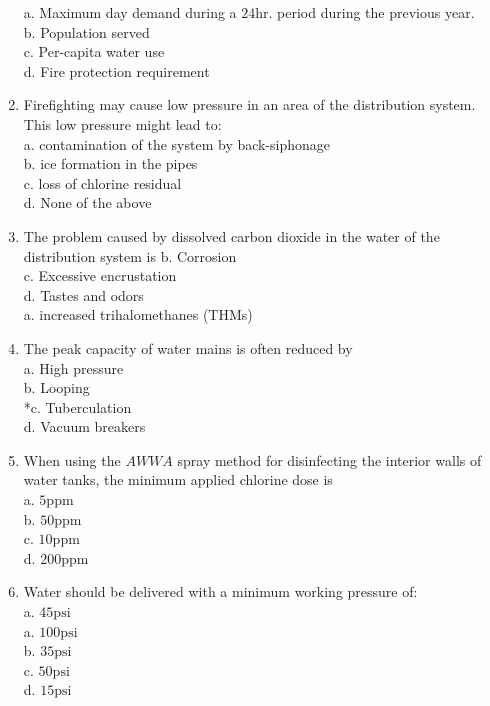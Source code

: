 \begin{enumerate}[1.]
a. Maximum day demand during a $24 \mathrm{hr}$. period during the previous year.\\
b. Population served\\
c. Per-capita water use\\
d. Fire protection requirement\\
\item Firefighting may cause low pressure in an area of the distribution system. This low pressure might lead to:\\
a. contamination of the system by back-siphonage\\
b. ice formation in the pipes\\
c. loss of chlorine residual\\
d. None of the above\\
\item The problem caused by dissolved carbon dioxide in the water of the distribution system is b. Corrosion\\
c. Excessive encrustation\\
d. Tastes and odors\\
a. increased trihalomethanes (THMs)\\
\item The peak capacity of water mains is often reduced by\\
a. High pressure\\
b. Looping\\
*c. Tuberculation\\
d. Vacuum breakers\\
\item When using the $A W W A$ spray method for disinfecting the interior walls of water tanks, the minimum applied chlorine dose is\\
a. $5 \mathrm{ppm}$\\
b. $50 \mathrm{ppm}$\\
c. $10 \mathrm{ppm}$\\
d. $200 \mathrm{ppm}$\\
\item Water should be delivered with a minimum working pressure of:\\
a. $45 \mathrm{psi}$\\
a. $100 \mathrm{psi}$\\
b. $35 \mathrm{psi}$\\
c. $50 \mathrm{psi}$\\
d. $15 \mathrm{psi}$ 


\end{enumerate}
